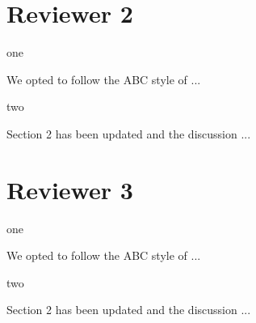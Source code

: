 \documentclass[answers,12pt]{exam}
\begin{document}
\section{Reviewer 2}

\begin{questions}
\question one
\begin{solution}
 We opted to follow the ABC style of ...
\end{solution}
\question  two
\begin{solution}
Section 2 has been updated and the discussion ...
\end{solution}
\end{questions}


\section{Reviewer 3}

\begin{questions}
\question one
\begin{solution}
 We opted to follow the ABC style of ...
\end{solution}
\question  two
\begin{solution}
Section 2 has been updated and the discussion ...
\end{solution}
\end{questions}
\end{document}
